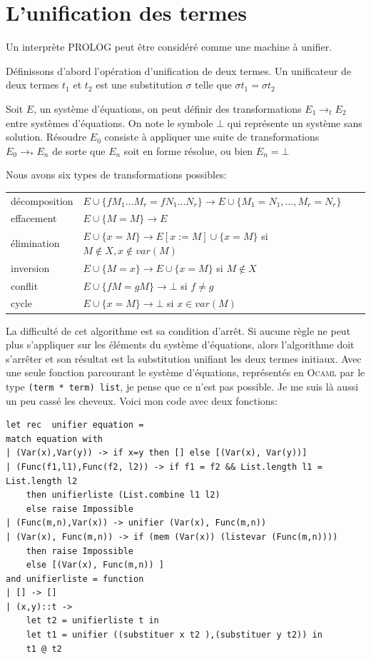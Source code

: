 \section{L'unification des termes}
Un interprète PROLOG peut être considéré comme une machine à unifier.

Définissons d'abord l'opération d'unification de deux termes.
Un unificateur de deux termes $t_1$ et $t_2$ est une substitution $\sigma$ telle que $\sigma t_1 = \sigma t_2$

Soit $E$, un système d'équations, on peut définir des transformations $E_{1} \rightarrow _t   E_{2} $
entre systèmes d'équations. On note le symbole $\bot$ qui représente un système sans solution.
Résoudre $E_0$ consiste à appliquer une suite de transformations $E_{0} \rightarrow _*   E_{n} $ de sorte que
$E_{n}$ soit en forme résolue, ou bien $E_{n} = \bot$

Nous avons six types de transformations possibles: 


\begin{tabular}{ll}
décomposition & $E \cup \{ f M_1 \dots M_r = f N_1 \dots N_r \} \rightarrow   E \cup \{ M_1 = N_1 , \dots ,M_r = N_r \} $ \\ 
effacement & $E \cup \{ M=M \} \rightarrow   E $ \\ 
élimination & $E \cup \{ x=M \} \rightarrow  E[x:=M] \cup \{ x=M \}$  si $M \notin X, x \notin var(M)$\\ 
inversion & $E \cup \{ M=x \}  \rightarrow  E \cup \{ x=M \}$ si $M \notin X$ \\ 
conflit &  $E \cup \{ f M = g M\} \rightarrow   \bot $ si $ f \neq g $  \\ 
cycle & $E \cup \{ x=M \} \rightarrow  \bot $ si $x \in var(M)$ \\ 
\end{tabular}

\vspace{0.5cm}

La difficulté de cet algorithme est  sa condition d'arrêt. 
 Si aucune règle ne peut plus s'appliquer sur les éléments du système d'équations, alors l'algorithme doit s'arrêter et son résultat est
la substitution unifiant les deux termes initiaux.
Avec une seule fonction parcourant le système d'équations, représentés en \textsc{Ocaml} par le type \texttt{(term * term) list},
je pense que ce n'est pas possible. Je me suis là aussi un peu cassé les cheveux.
Voici mon code avec deux fonctions:
\begin{verbatim}
let rec  unifier equation =
match equation with
| (Var(x),Var(y)) -> if x=y then [] else [(Var(x), Var(y))] 
| (Func(f1,l1),Func(f2, l2)) -> if f1 = f2 && List.length l1 = List.length l2 
	then unifierliste (List.combine l1 l2)
	else raise Impossible
| (Func(m,n),Var(x)) -> unifier (Var(x), Func(m,n)) 
| (Var(x), Func(m,n)) -> if (mem (Var(x)) (listevar (Func(m,n)))) 
	then raise Impossible
	else [(Var(x), Func(m,n)) ] 
and unifierliste = function
| [] -> []
| (x,y)::t ->
	let t2 = unifierliste t in
	let t1 = unifier ((substituer x t2 ),(substituer y t2)) in
	t1 @ t2
\end{verbatim}
% 


